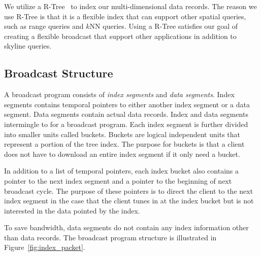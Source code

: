 \documentclass{sig-alternate}
\begin{document}
We utilize a R-Tree~\cite{DBLP:conf/sigmod/Guttman84} to index our
multi-dimensional data records. The reason we use R-Tree is that it is
a flexible index that can support other spatial queries, such as range
queries and $k$NN queries. Using a R-Tree satisfies our goal of creating
a flexible broadcast that support other applications in addition to skyline
queries.

\subsection{Broadcast Structure}

A broadcast program consists of \emph{index segments} and \emph{data segments}.
Index segments contains temporal pointers to either another index segment or
a data segment. Data segments
contain actual data records. Index and data segments intermingle to for
a broadcast program. Each index segment is further divided into smaller units
called buckets. Buckets are logical independent units that represent a portion
of the tree index. The purpose for buckets is that a client does not have to
download an entire index segment if it only need a bucket.

In addition to a list of temporal pointers, each index bucket also contains
a pointer to the next index segment and a pointer to the beginning of next
broadcast cycle. The purpose of these pointers is to direct the client to
the next index segment in the case that the client tunes in at the index
bucket but is not interested in the data pointed by the index.

To save bandwidth, data segments do not contain any index information other
than data records. The broadcast program structure is illustrated in
Figure~\ref{fig:index_packet}.



\end{document}
